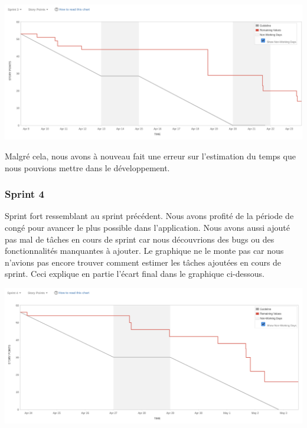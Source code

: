 \documentclass[t, 12pt, usenames,dvipsnames]{article}
\begin{document}
                \begin{center}
                    \includegraphics[scale=.25]{images/graph-new/sprint3.png}
                    \label{fig:sprint3_graph}
                \end{center}
                
                \noindent Malgré cela, nous avons à nouveau fait une erreur sur l'estimation du temps que nous pouvions mettre dans le développement.
                
                
            \subsubsection{Sprint 4}
                \noindent Sprint fort ressemblant au sprint précédent. Nous avons profité de la période de congé pour avancer le plus possible dans l'application. Nous avons aussi ajouté pas mal de tâches en cours de sprint car nous découvrions des bugs ou des fonctionnalités manquantes à ajouter. Le graphique ne le monte pas car nous n'avions pas encore trouver comment estimer les tâches ajoutées en cours de sprint.
                Ceci explique en partie l'écart final dans le graphique ci-dessous.
                
                \begin{center}
                    \includegraphics[scale=.25]{images/graph-new/sprint4.png}
                    \label{fig:sprint4_graph}
                \end{center}
        
\end{document}
